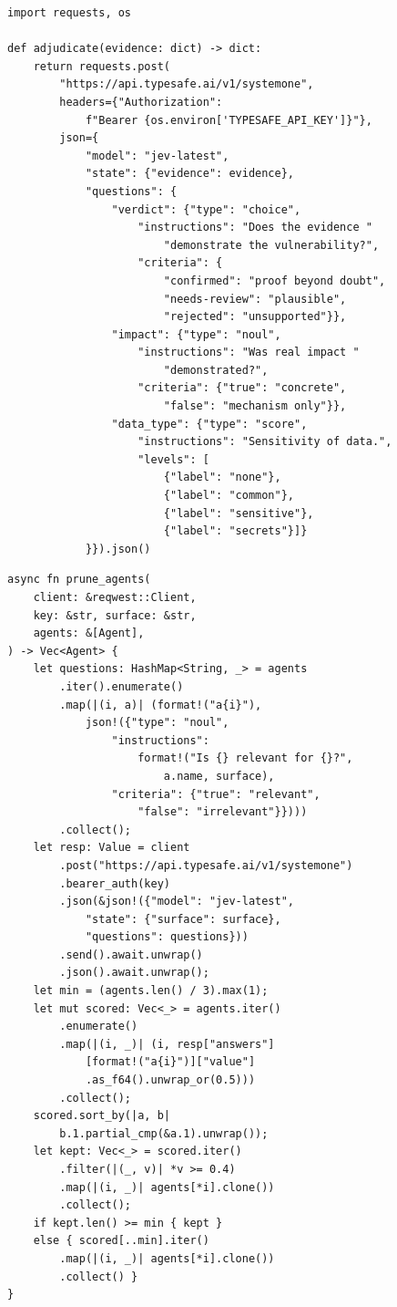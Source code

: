 \documentclass[conference]{IEEEtran}
\begin{document}
\lstset{language=Python}
\begin{lstlisting}[caption={Python: Finding adjudication via Jev API.},label={lst:python}]
import requests, os

def adjudicate(evidence: dict) -> dict:
    return requests.post(
        "https://api.typesafe.ai/v1/systemone",
        headers={"Authorization":
            f"Bearer {os.environ['TYPESAFE_API_KEY']}"},
        json={
            "model": "jev-latest",
            "state": {"evidence": evidence},
            "questions": {
                "verdict": {"type": "choice",
                    "instructions": "Does the evidence "
                        "demonstrate the vulnerability?",
                    "criteria": {
                        "confirmed": "proof beyond doubt",
                        "needs-review": "plausible",
                        "rejected": "unsupported"}},
                "impact": {"type": "noul",
                    "instructions": "Was real impact "
                        "demonstrated?",
                    "criteria": {"true": "concrete",
                        "false": "mechanism only"}},
                "data_type": {"type": "score",
                    "instructions": "Sensitivity of data.",
                    "levels": [
                        {"label": "none"},
                        {"label": "common"},
                        {"label": "sensitive"},
                        {"label": "secrets"}]}
            }}).json()
\end{lstlisting}

\lstset{language=Rust}
\begin{lstlisting}[caption={Rust: Batched Noul agent pruning.},label={lst:rust}]
async fn prune_agents(
    client: &reqwest::Client,
    key: &str, surface: &str,
    agents: &[Agent],
) -> Vec<Agent> {
    let questions: HashMap<String, _> = agents
        .iter().enumerate()
        .map(|(i, a)| (format!("a{i}"),
            json!({"type": "noul",
                "instructions":
                    format!("Is {} relevant for {}?",
                        a.name, surface),
                "criteria": {"true": "relevant",
                    "false": "irrelevant"}})))
        .collect();
    let resp: Value = client
        .post("https://api.typesafe.ai/v1/systemone")
        .bearer_auth(key)
        .json(&json!({"model": "jev-latest",
            "state": {"surface": surface},
            "questions": questions}))
        .send().await.unwrap()
        .json().await.unwrap();
    let min = (agents.len() / 3).max(1);
    let mut scored: Vec<_> = agents.iter()
        .enumerate()
        .map(|(i, _)| (i, resp["answers"]
            [format!("a{i}")]["value"]
            .as_f64().unwrap_or(0.5)))
        .collect();
    scored.sort_by(|a, b|
        b.1.partial_cmp(&a.1).unwrap());
    let kept: Vec<_> = scored.iter()
        .filter(|(_, v)| *v >= 0.4)
        .map(|(i, _)| agents[*i].clone())
        .collect();
    if kept.len() >= min { kept }
    else { scored[..min].iter()
        .map(|(i, _)| agents[*i].clone())
        .collect() }
}
\end{lstlisting}
\end{document}

